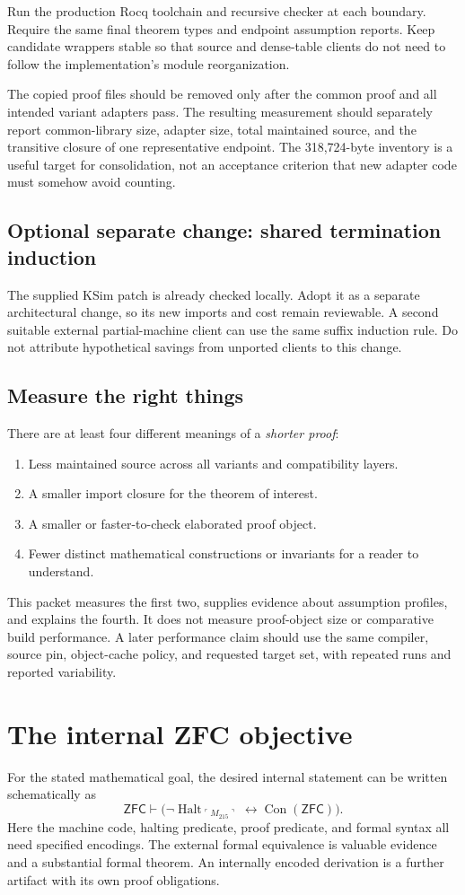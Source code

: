 \documentclass[11pt,a4paper]{article}
\newcommand{\Con}{\operatorname{Con}}
\newcommand{\ZFC}{\mathsf{ZFC}}
\theoremstyle{remark}
\begin{document}
Run the production Rocq toolchain and recursive checker at each boundary.
Require the same final theorem types and endpoint assumption reports.
Keep candidate wrappers stable so that source and dense-table clients do
not need to follow the implementation's module reorganization.

The copied proof files should be removed only after the common proof and
all intended variant adapters pass. The resulting measurement should
separately report common-library size, adapter size, total maintained
source, and the transitive closure of one representative endpoint.
The 318,724-byte inventory is a useful target for consolidation, not an
acceptance criterion that new adapter code must somehow avoid counting.

\subsection{Optional separate change: shared termination induction}
The supplied KSim patch is already checked locally.
Adopt it as a separate architectural change, so its new imports and cost
remain reviewable. A second suitable external partial-machine client can
use the same suffix induction rule. Do not attribute hypothetical savings
from unported clients to this change.

\subsection{Measure the right things}
There are at least four different meanings of a \emph{shorter proof}:
\begin{enumerate}
\item Less maintained source across all variants and compatibility layers.
\item A smaller import closure for the theorem of interest.
\item A smaller or faster-to-check elaborated proof object.
\item Fewer distinct mathematical constructions or invariants for a reader
to understand.
\end{enumerate}
This packet measures the first two, supplies evidence about assumption
profiles, and explains the fourth. It does not measure proof-object size
or comparative build performance. A later performance claim should use the
same compiler, source pin, object-cache policy, and requested target set,
with repeated runs and reported variability.

\section{The internal ZFC objective}
\label{sec:internal}
For the stated mathematical goal, the desired internal statement can be
written schematically as
\[
 \ZFC\vdash
 \bigl(\neg\operatorname{Halt}_{\ulcorner M_{215}\urcorner}
       \leftrightarrow
       \Con(\ZFC)\bigr).
\]
Here the machine code, halting predicate, proof predicate, and formal
syntax all need specified encodings. The external formal equivalence is
valuable evidence and a substantial formal theorem. An internally encoded
derivation is a further artifact with its own proof obligations.
\end{document}
